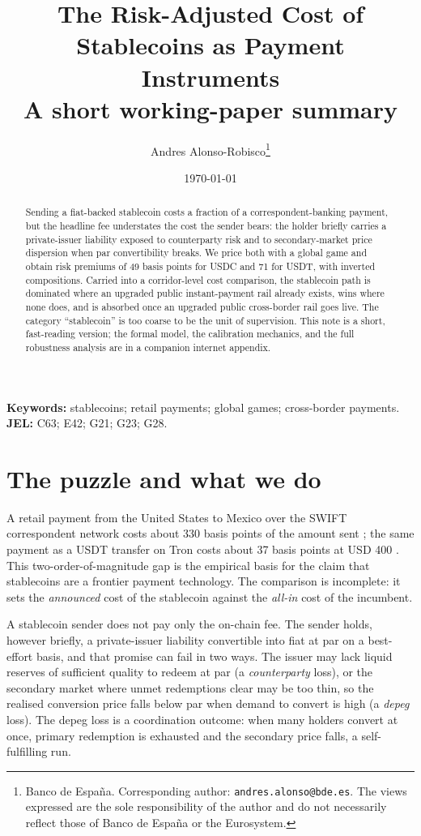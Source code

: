 \documentclass[12pt]{article}
\title{The Risk-Adjusted Cost of Stablecoins as Payment Instruments\\[0.3em]
\large A short working-paper summary}
\author{
Andres Alonso-Robisco\thanks{Banco de Espa\~na.
Corresponding author: \texttt{andres.alonso@bde.es}.
The views expressed are the sole responsibility of the author and do not
necessarily reflect those of Banco de Espa\~na or the Eurosystem.}
}
\date{\today}
\begin{document}
\maketitle
\onehalfspacing

\begin{abstract}
\noindent Sending a fiat-backed stablecoin costs a fraction of a correspondent-banking payment, but the headline fee understates the cost the sender bears: the holder briefly carries a private-issuer liability exposed to counterparty risk and to secondary-market price dispersion when par convertibility breaks. We price both with a global game and obtain risk premiums of 49 basis points for USDC and 71 for USDT, with inverted compositions. Carried into a corridor-level cost comparison, the stablecoin path is dominated where an upgraded public instant-payment rail already exists, wins where none does, and is absorbed once an upgraded public cross-border rail goes live. The category ``stablecoin'' is too coarse to be the unit of supervision. This note is a short, fast-reading version; the formal model, the calibration mechanics, and the full robustness analysis are in a companion internet appendix.
\end{abstract}

\medskip
\noindent\textbf{Keywords:} stablecoins; retail payments; global games; cross-border payments.
\quad\textbf{JEL:} C63; E42; G21; G23; G28.

\clearpage

\section{The puzzle and what we do}\label{sec:intro}

A retail payment from the United States to Mexico over the SWIFT correspondent network costs about 330 basis points of the amount sent \citep{rpw_q3_2025}; the same payment as a USDT transfer on Tron costs about 37 basis points at USD 400 \citep{tronsave_blog_2026}. This two-order-of-magnitude gap is the empirical basis for the claim that stablecoins are a frontier payment technology. The comparison is incomplete: it sets the \emph{announced} cost of the stablecoin against the \emph{all-in} cost of the incumbent.

A stablecoin sender does not pay only the on-chain fee. The sender holds, however briefly, a private-issuer liability convertible into fiat at par on a best-effort basis, and that promise can fail in two ways. The issuer may lack liquid reserves of sufficient quality to redeem at par (a \emph{counterparty} loss), or the secondary market where unmet redemptions clear may be too thin, so the realised conversion price falls below par when demand to convert is high (a \emph{depeg} loss). The depeg loss is a coordination outcome: when many holders convert at once, primary redemption is exhausted and the secondary price falls, a self-fulfilling run.
\end{document}

